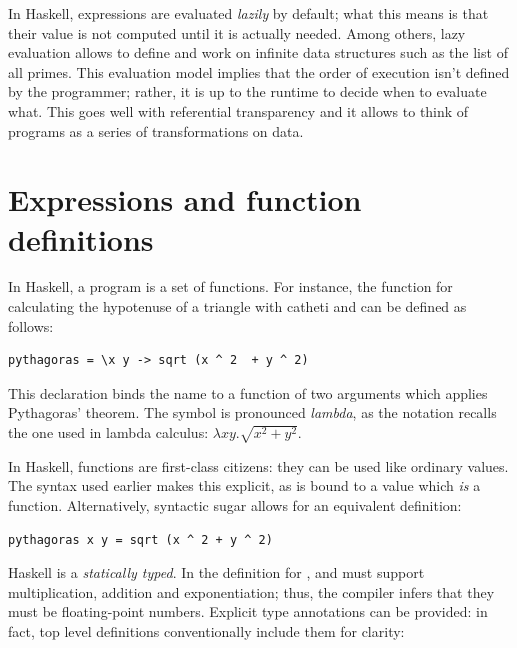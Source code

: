 \documentclass[UdineBachThesis,american,11pt]{PhdThesis}
\begin{document}
  In Haskell, expressions are evaluated \emph{lazily} by default; what this
  means is that their value is not computed until it is actually needed. Among
  others, lazy evaluation allows to define and work on infinite data structures
  such as the list of all primes. This evaluation model implies that the order
  of execution isn't defined by the programmer; rather, it is up to the runtime
  to decide when to evaluate what. This goes well with referential transparency
  and it allows to think of programs as a series of transformations on data.

  \section{Expressions and function definitions}

  In Haskell, a program is a set of functions. For instance, the function for
  calculating the hypotenuse of a triangle with catheti \lstinline@x@ and
  \lstinline@y@ can be defined as follows:

  \begin{lstlisting}[gobble=4,basicstyle=\ttfamily\small]
    pythagoras = \x y -> sqrt (x ^ 2  + y ^ 2)
  \end{lstlisting}

  \pagebreak

  This declaration binds the name \lstinline@pythagoras@ to a function of two
  arguments which applies Pythagoras' theorem. The symbol \lstinline@\@ is
  pronounced \emph{lambda}, as the notation recalls the one used in lambda
  calculus: $\lambda x y . \sqrt{x^2 + y^2}$.

  In Haskell, functions are first-class citizens: they can be used like ordinary
  values. The syntax used earlier makes this explicit, as \lstinline@pythagoras@
  is bound to a value which \emph{is} a function. Alternatively, syntactic sugar
  allows for an equivalent definition:

  \begin{lstlisting}[gobble=4,basicstyle=\ttfamily\small]
    pythagoras x y = sqrt (x ^ 2 + y ^ 2)
  \end{lstlisting}

  Haskell is a \emph{statically typed}. In the definition for
  \lstinline@pythagoras@, \lstinline@x@ and \lstinline@y@ must support
  multiplication, addition and exponentiation; thus, the compiler infers that
  they must be floating-point numbers. Explicit type annotations can be
  provided: in fact, top level definitions conventionally include them for
  clarity:
\end{document}
